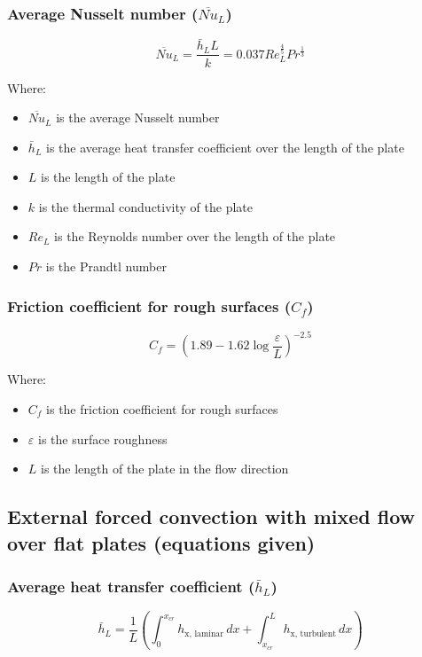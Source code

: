\documentclass[11pt]{article}
\begin{document}
\subsubsection{Average Nusselt number (\(\overline{Nu}_L\))}
\label{sec:orgc160943}
\[\overline{Nu}_L = \frac{\bar{h}_L L}{k} = 0.037 Re_L^{\frac{4}{5}} Pr^{\frac{1}{3}}\]

Where:
\begin{itemize}
\item \(\overline{Nu}_L\) is the average Nusselt number
\item \(\bar{h}_L\) is the average heat transfer coefficient over the length of the plate
\item \(L\) is the length of the plate
\item \(k\) is the thermal conductivity of the plate
\item \(Re_L\) is the Reynolds number over the length of the plate
\item \(Pr\) is the Prandtl number
\end{itemize}
\subsubsection{Friction coefficient for rough surfaces (\(C_f\))}
\label{sec:org90de3ff}
\[C_f = \left(1.89 - 1.62 \log \frac{\varepsilon}{L} \right)^{-2.5}\]

Where:
\begin{itemize}
\item \(C_f\) is the friction coefficient for rough surfaces
\item \(\varepsilon\) is the surface roughness
\item \(L\) is the length of the plate in the flow direction
\end{itemize}

 \newpage
\subsection{External forced convection with mixed flow over flat plates (equations given)}
\label{sec:org3faa6d1}

\subsubsection{Average heat transfer coefficient (\(\bar{h}_L\))}
\label{sec:orgc808fe0}
\[\bar{h}_L = \frac{1}{L} \left(\int_0^{x_{cr}} h_{\text{x, laminar}} \, dx + \int_{x_{cr}}^L h_{\text{x, turbulent}} \, dx \right)\]
\end{document}
